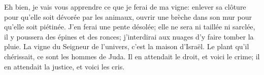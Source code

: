 Eh bien, je vais vous apprendre ce que je ferai de ma vigne:
	enlever sa clôture pour qu’elle soit dévorée par les animaux,
	ouvrir une brèche dans son mur pour qu’elle soit piétinée.
J’en ferai une pente désolée;
	elle ne sera ni taillée ni sarclée, il y poussera des épines et des ronces;
	j’interdirai aux nuages d’y faire tomber la pluie.
La vigne du Seigneur de l’univers, c’est la maison d’Israël.
	Le plant qu’il chérissait, ce sont les hommes de Juda.
Il en attendait le droit, et voici le crime;
	il en attendait la justice, et voici les cris.
